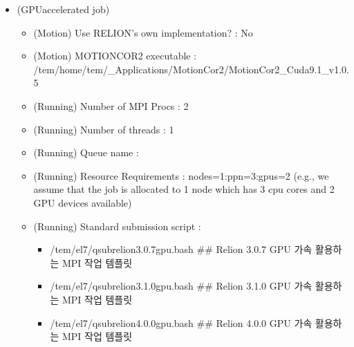 \documentclass[a4paper,10pt,english]{sphinxmanual}
\begin{document}
\begin{itemize}
\item {} 
\sphinxAtStartPar
{} (GPU\sphinxhyphen{}accelerated job)
\begin{itemize}
\item {} 
\sphinxAtStartPar
(Motion) Use RELION’s own implementation? : No

\item {} 
\sphinxAtStartPar
(Motion) MOTIONCOR2 executable : /tem/home/tem/\_Applications/MotionCor2/MotionCor2\_Cuda9.1\_v1.0.5

\item {} 
\sphinxAtStartPar
(Running) Number of MPI Procs : 2

\item {} 
\sphinxAtStartPar
(Running) Number of threads : 1

\item {} 
\sphinxAtStartPar
(Running) Queue name : 

\item {} 
\sphinxAtStartPar
(Running) Resource Requirements : nodes=1:ppn=3:gpus=2  (e.g., we assume that the job is allocated to 1 node which has 3 cpu cores and 2 GPU devices available)

\item {} 
\sphinxAtStartPar
(Running) Standard submission script :
\begin{itemize}
\item {} 
\sphinxAtStartPar
/tem/el7/qsub\sphinxhyphen{}relion\sphinxhyphen{}3.0.7\sphinxhyphen{}gpu.bash           \#\# Relion 3.0.7 GPU 가속 활용하는 MPI 작업 템플릿

\item {} 
\sphinxAtStartPar
/tem/el7/qsub\sphinxhyphen{}relion\sphinxhyphen{}3.1.0\sphinxhyphen{}gpu.bash           \#\# Relion 3.1.0 GPU 가속 활용하는 MPI 작업 템플릿

\item {} 
\sphinxAtStartPar
/tem/el7/qsub\sphinxhyphen{}relion\sphinxhyphen{}4.0.0\sphinxhyphen{}gpu.bash           \#\# Relion 4.0.0 GPU 가속 활용하는 MPI 작업 템플릿

\end{itemize}

\end{itemize}

\end{itemize}
\end{document}
